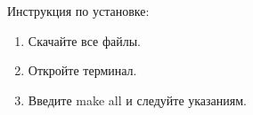 \documentclass[a4paper, 14pt] {extarticle}
\begin{document}
Инструкция по установке:
\begin{enumerate} 
  \item Скачайте все файлы.
  \item Откройте терминал.
  \item Введите make all и следуйте указаниям.
\end{enumerate}
\end{document}

